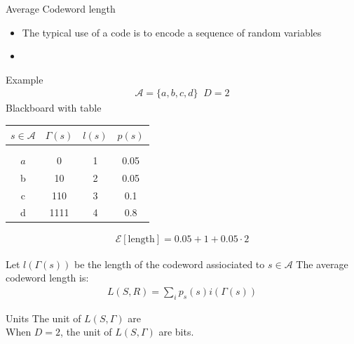 \begin{parag}{Average Codeword length}
    \begin{itemize}
        \item The typical use of a code is to encode a sequence of random variables
            \item
    \end{itemize}
    \begin{subparag}{Example}
        \begin{align*}
            \mathcal{A} = \{a, b, c, d\} \; \; D = 2
        \end{align*}
        Blackboard with table
        \begin{tabular}{cccc}
            $s \in \mathcal{A} $ & $ \Gamma (s)$ & $l(s)$ & $p(s)$ \\
            \hline \\ \hline
            \\
            $a$ & $ 0$ & 1 & 0.05 \\
            \hline 
            b & 10 & 2 & 0.05 \\
            c & 110 & 3 & 0.1 \\
            d & 1111 & 4 & 0.8
        \end{tabular}

        \begin{align*}
            \mathcal{E} [ \text{length} ] = 0.05 + 1 + 0.05 \cdot 2
        \end{align*}
        
             
        

    \end{subparag}
    \begin{definition}
        Let $l( \Gamma (s))$ be the length of the codeword assiociated to $s \in \mathcal{A}$ The average codeword length is:
        \begin{align*}
            L(S, R) = \sum_i p_s(s) i ( \Gamma (s)) 
        \end{align*}
        
    \end{definition}
    
        \begin{subparag}{Units}
            The unit of $L(S, \Gamma ) $ are 
            \\
            When $D = 2$, the unit of $L(S, \Gamma )$ are bits.
        \end{subparag}
\end{parag}


